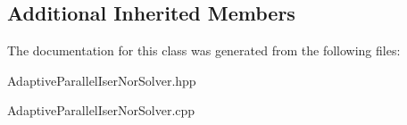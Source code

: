 \subsection*{Additional Inherited Members}


The documentation for this class was generated from the following files\+:\begin{DoxyCompactItemize}
\item 
Adaptive\+Parallel\+Iser\+Nor\+Solver.\+hpp\item 
Adaptive\+Parallel\+Iser\+Nor\+Solver.\+cpp\end{DoxyCompactItemize}
